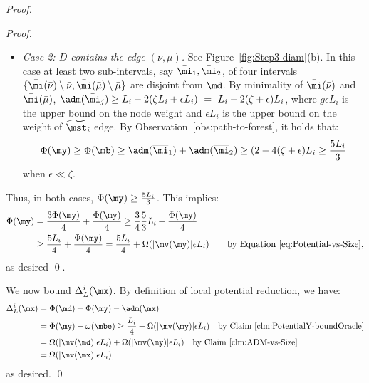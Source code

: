 \begin{proof}
\begin{proof}
\begin{itemize}
			\item  \emph{Case 2: $D$ contains the edge $(\nu,\mu)$.} See Figure~\ref{fig:Step3-diam}(b). In this case at least two sub-intervals, say $\bar\mi_1,\bar\mi_2$,  of four intervals $\{\bar\mi(\bar\nu)\setminus \bar\nu, \bar{\mi}(\bar\mu)\setminus \bar\mu\}$ are disjoint from $\md$. By minimality of  $\bar\mi(\bar\nu)$ and $\bar\mi(\bar\mu)$, $\adm(\bar\mi_j)\geq L_i - 2(\zeta L_i + \epsilon L_i) ~=~ L_i - 2(\zeta+\epsilon) L_i$, where $g\epsilon L_i$  is the upper bound on the node weight and $\epsilon L_i$ is the upper bound on the weight of $\widetilde{\mst}_i$ edge.   By Observation~\ref{obs:path-to-forest}, it holds that:
			\begin{equation*}
			\Phi(\my)\geq \Phi(\mb)\geq \adm(\overline{\mi}_1) + \adm(\overline{\mi}_2) 	\geq (2- 4(\zeta + \epsilon) L_i \geq \frac{5L_i}{3}
			\end{equation*}
			when $\epsilon \ll \zeta$.
		\end{itemize}	
		Thus, in both cases, $\Phi(\my) \geq \frac{5L_i}{3}$. This implies:
		\begin{equation*}
		\begin{split}
		\Phi(\my) &= \frac{3 \Phi(\my)}{4}  + \frac{\Phi(\my)}{4} \geq \frac{3}{4}\frac{5}{3} L_i + \frac{\Phi(\my)}{4} \\
		&\geq \frac{5 L_i}{4} +  \frac{\Phi(\my)}{4}  = \frac{5 L_i}{4}  +  \Omega(|\mv(\my)|\epsilon L_i) \qquad \mbox{by Equation~\eqref{eq:Potential-vs-Size}},		
		\end{split}
		\end{equation*} 
		as desired \qed. 
	\end{proof}


We now bound $\Delta^i_{L}(\mx)$. By definition of local potential reduction, we have:
\begin{equation*}
\begin{split}
	\Delta_{L}^i(\mx)  &= \Phi(\md) + \Phi(\my) - \adm(\mx)\\
&= \Phi(\my) - \omega(\mbe) \geq  \frac{L_i}{4}  +  \Omega(|\mv(\my)|\epsilon L_i) \quad \mbox{by Claim~\ref{clm:PotentialY-boundOracle}}\\
&= \Omega(|\mv(\md)|\epsilon L_i) +  \Omega(|\mv(\my)|\epsilon L_i) \quad \mbox{by Claim~\ref{clm:ADM-vs-Size}}\\
&= \Omega(|\mv(\mx)|\epsilon L_i), 
\end{split}
\end{equation*}
as desired. \qed
	\end{proof}


